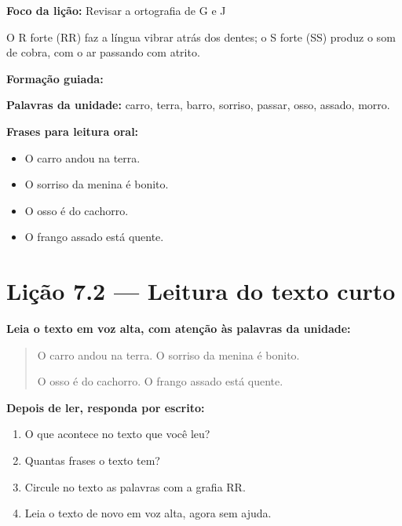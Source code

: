 \textbf{Foco da lição:} Revisar a ortografia de G e J


\begin{boquinha}
O R forte (RR) faz a língua vibrar atrás dos dentes; o S forte (SS) produz o som de cobra, com o ar passando com atrito.
\end{boquinha}

\noindent\textbf{Formação guiada:}

\begin{center}
\end{center}

\noindent\textbf{Palavras da unidade:} carro, terra, barro, sorriso, passar, osso, assado, morro.

\noindent\textbf{Frases para leitura oral:}
\begin{itemize}[leftmargin=1.6em]
  \item O carro andou na terra.
  \item O sorriso da menina é bonito.
  \item O osso é do cachorro.
  \item O frango assado está quente.
\end{itemize}

\section{Lição 7.2 --- Leitura do texto curto}

\noindent\textbf{Leia o texto em voz alta, com atenção às palavras da unidade:}


\begin{quote}
O carro andou na terra. O sorriso da menina é bonito.

O osso é do cachorro. O frango assado está quente.
\end{quote}

\textbf{Depois de ler, responda por escrito:}
\begin{enumerate}

  \item O que acontece no texto que você leu?
  \begin{center}
  \underline{\hspace{12cm}}
  \end{center}

  \item Quantas frases o texto tem?
  \begin{center}
  \underline{\hspace{12cm}}
  \end{center}

  \item Circule no texto as palavras com a grafia RR.

  \item Leia o texto de novo em voz alta, agora sem ajuda.

\end{enumerate}

